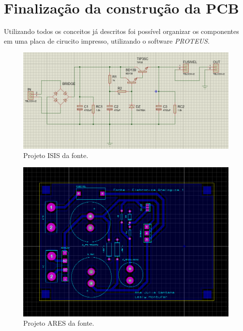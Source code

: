 \documentclass[a4paper,12pt,oneside,openany,table,xcdraw]{article}
\begin{document}
\section{Finalização da construção da PCB}
Utilizando todos os conceitos já descritos foi possível organizar os componentes em uma placa de cirucito impresso, utilizando o software \emph{PROTEUS}.
\begin{figure}[H]
\centering
\captionsetup{font=scriptsize}
\includegraphics[width=16cm]{isis}
\caption{Projeto ISIS da fonte.}
\label{isis}
\end{figure}

\begin{figure}[H]
\centering
\captionsetup{font=scriptsize}
\includegraphics[width=16cm]{ares}
\caption{Projeto ARES da fonte.}
\label{ares}
\end{figure}
\end{document}
